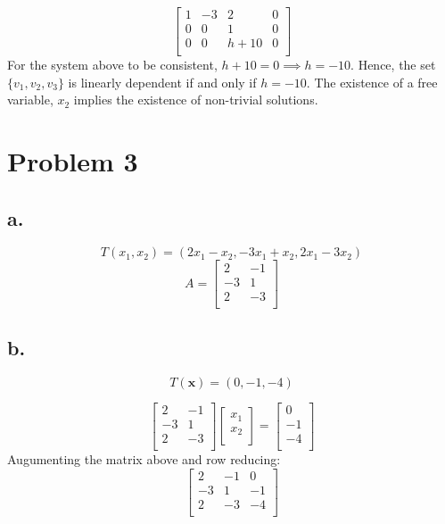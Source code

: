 \documentclass[12pt, a4paper]{article}
\begin{document}
\[
    \begin{bmatrix}
        1 & -3 & 2 & 0 \\
        0 & 0 & 1 & 0 \\
        0 & 0 & h + 10 & 0 \\
    \end{bmatrix}
\]
For the system above to be consistent, $h + 10 = 0 \implies h = -10$. Hence, the set $\{v_1, v_2, v_3\}$ is linearly dependent if and only if $h = -10$. The existence of a free variable, $x_2$ implies the existence of non-trivial solutions.

\section*{Problem 3}
\subsection*{a.}
\[
    T(x_1, x_2) = (2x_1-x_2, -3x_1+x_2, 2x_1-3x_2)
\]
\[
    A = \begin{bmatrix}
        2 & -1 \\
        -3 & 1 \\
        2 & -3 \\
    \end{bmatrix}
\]

\subsection*{b.}
\[
    T(\boldsymbol{x}) = (0,-1,-4)
\]

\[
    \begin{bmatrix}
        2 & -1 \\
        -3 & 1 \\
        2 & -3 \\
    \end{bmatrix} \begin{bmatrix}
        x_1 \\
        x_2 \\
    \end{bmatrix} = \begin{bmatrix}
        0 \\
        -1 \\
        -4 \\
    \end{bmatrix}
\]
Augumenting the matrix above and row reducing:
\[
    \begin{bmatrix}
        2 & -1 & 0 \\
        -3 & 1 & -1 \\
        2 & -3 & -4 \\
    \end{bmatrix}
\]
\end{document}
